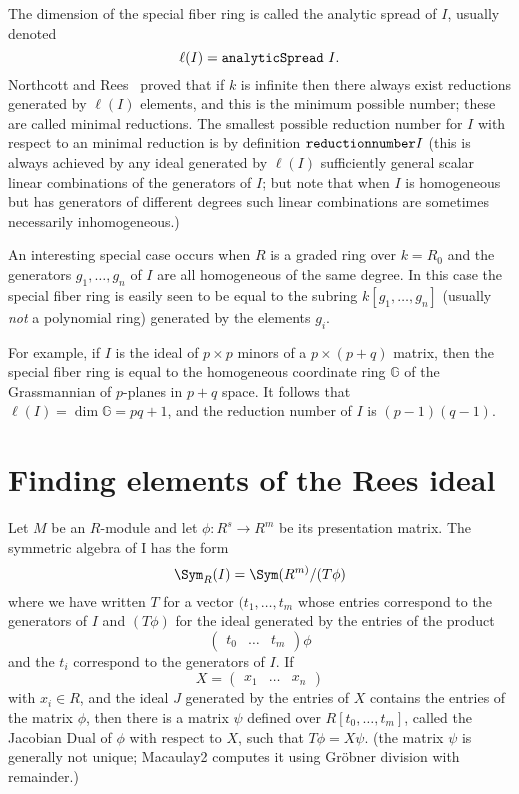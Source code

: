 \documentclass[twoside,12pt, leqno]{amsart}
\begin{document}
\begin{normalsize}
The dimension of the special fiber ring is called the analytic spread of $I$, usually
denoted
$$
\ell(I) = {\tt analyticSpread\ }I.
$$
Northcott and Rees~\cite{NR} proved that if $k$ is infinite then there always exist reductions
generated by $\ell(I)$ elements, and this is the minimum possible number; these are called
minimal reductions. The smallest possible reduction number for $I$ with respect to an minimal reduction is  by definition ${\tt reduction number} I$ (this is always achieved by any ideal generated by $\ell(I)$ sufficiently general scalar linear combinations of the generators of $I$; but note that when $I$ is homogeneous but has generators of different degrees such linear combinations are sometimes necessarily inhomogeneous.)

An interesting special case occurs when $R$ is a graded ring over $k = R_0$ and the generators $g_1,\dots, g_n$ of $I$ are all homogeneous of the same degree. In this case the special fiber ring is easily seen to be equal to the subring $k[g_1,\dots,g_n]$ (usually \emph{not} a polynomial ring) generated by the elements $g_i$.

\def\G{{\mathbb G}}
For example, if $I$ is the ideal of $p\times p$ minors of a $p\times (p+q)$ matrix, then
the special fiber ring is equal to the homogeneous coordinate ring $\G$ of the Grassmannian of
$p$-planes in $p+q$ space. It follows that $\ell(I) = \dim \G = pq+1$, and the reduction number of $I$ is
$(p-1)(q-1)$.

\section{Finding elements of the Rees ideal}%

Let $M$ be an $R$-module and let $\phi: R^{s}\to R^{m}$ be its presentation matrix.
     The symmetric algebra of I has the form      
     $$
     \Sym_R(I) = \Sym(R^{m)}/(T\phi)
     $$
     where we have written $T$ for a vector
     $(t_{1}, \dots, t_{m}$ whose entries correspond to the generators of $I$ and
      $(T\phi)$  for the ideal generated by the entries
     of the product 
 $$
\begin{pmatrix}
 t_{0}&\dots&t_{m}
\end{pmatrix}\phi
$$
and the $t_{i}$ correspond to the generators of $I$. If 
     $$
     X = \begin{pmatrix}
x_1&\dots&x_{n}
\end{pmatrix}
$$
     with $x_i \in R$, and the ideal $J$ generated by the entries of $X$ 
     contains the entries of the matrix $\phi$, then there is 
     a matrix $\psi$ defined over $R[t_0, \dots, t_m]$, called the Jacobian Dual of $\phi$ with respect to $X$,
     such that $T\phi = X\psi$. (the matrix $\psi$ is generally
     not unique; Macaulay2 computes it using Gr\"obner division with remainder.)
           

\end{normalsize}
\end{document}
